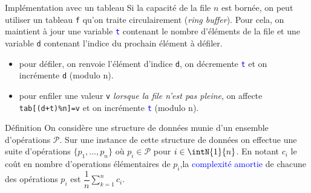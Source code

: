 \documentclass[10pt]{beamer}
\begin{document}
\begin{frame}[fragile]{\Ctitle}{\stitle}
	\begin{block}{Implémentation avec un tableau}
		Si la capacité de la file  $n$ est bornée, on peut utiliser  un tableau {\tt f} qu'on traite circulairement (\textit{ring buffer}). Pour cela, on maintient à jour une variable \textcolor{blue}{\tt t} contenant le nombre d'éléments de la file et une variable \textcolor{OliveGreen}{\tt d} contenant l'indice du prochain élément à défiler.
		\begin{itemize}
			\item<2-> pour défiler, on renvoie l'élément d'indice \textcolor{OliveGreen}{\tt d}, on décremente \textcolor{blue}{\tt t} et on incrémente \textcolor{OliveGreen}{\tt d} (modulo n).
			\item<3-> pour enfiler une valeur {\tt v} \textit{lorsque la file n'est pas pleine}, on affecte {\tt tab[(d+t)\%n]=v} et on incrémente \textcolor{blue}{\tt t} (modulo n).
		\end{itemize}

	\end{block}
\end{frame}

\begin{frame}[fragile]{\Ctitle}{\stitle}
	\begin{alertblock}{Définition}
		On considère une structure de données munie d'un ensemble d'opérations $\mathcal{P}$. Sur une instance de cette structure de données on effectue une suite d'opérations $\{p_1, \dots, p_n\}$ où $p_i \in \mathcal{P}$ pour $i \in \intN{1}{n}$.
		En notant $c_i$ le coût en nombre d'operations élémentaires de $p_i$,la \textcolor{blue}{complexité amortie} de chacune des opérations $p_i$ est  $\displaystyle\dfrac{1}{n}{\sum_{k=1}^n c_i}$.
	\end{alertblock}
\end{frame}
\end{document}

